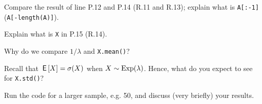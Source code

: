 \begin{exercise}
Compare the result of  line P.12 and P.14 (R.11 and R.13);  explain what is \texttt{A[:-1]} (\texttt{A[-length(A)]}).
\end{exercise}

\begin{exercise}
 Explain what is \texttt{X} in P.15 (R.14).
\end{exercise}

\begin{exercise}
Why do we compare $1/\lambda$ and \texttt{X.mean()}?
\end{exercise}

\begin{exercise}
Recall that $\,\mathsf{E}\left[X\right] = \sigma (X)$ when $X\sim \mathrm{Exp}(\lambda)$.
Hence, what do you expect to see for \texttt{X.std()}?
\end{exercise}

\begin{exercise}
 Run the code for a larger sample, e.g. 50, and discuss (very briefly) your results.
\end{exercise}



